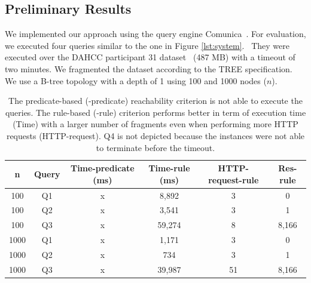 \subsection{Preliminary Results}

We implemented our approach using the query engine Comunica~\cite{comunica}.
For evaluation, we executed four queries similar to the one in Figure \ref{lst:system}.~
They were executed over the DAHCC participant 31 dataset~\cite{dahcc_resource} (487 MB) with a timeout of two minutes.
We fragmented the dataset according to the TREE specification.
We use a B-tree topology with a depth of 1 using 100 and 1000 nodes ($n$).

\begin{table}[ht]
    \centering
    \begin{tabular}{|c|c|c|c|c|c|}
        \hline
        \textbf{n} & \textbf{Query} & \textbf{Time-predicate (ms)}  & \textbf{Time-rule (ms)} & \textbf{HTTP-request-rule} & \textbf{Res-rule} \\
        \hline
        100 & Q1 & x & 8,892& 3 & 0 \\
        100 & Q2 & x & 3,541& 3 & 1 \\
        100 & Q3 & x & 59,274& 8 & 8,166 \\
        \hhline{|=|=|=|=|=|=|}
        1000 & Q1 & x & 1,171& 3 & 0 \\
        1000 & Q2 & x & 734& 3 & 1 \\
        1000 & Q3 & x & 39,987& 51 & 8,166 \\
        \hline
    \end{tabular}
    \caption{
    The predicate-based (-predicate) reachability criterion is not able to execute the queries. 
    The rule-based (-rule) criterion performs better in term of execution time (Time) with a larger number of fragments even when performing more HTTP requests (HTTP-request).
    Q4 is not depicted because the instances were not able to terminate before the timeout.
    }
    \label{tab:result}
    \vspace*{-0.15cm}
\end{table}

